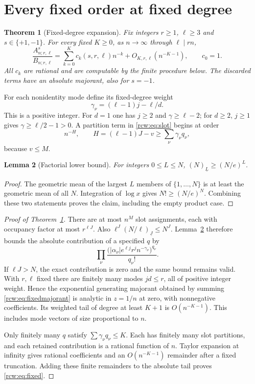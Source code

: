 \documentclass[11pt]{article}
\newtheorem{theorem}{Theorem}[section]
\newtheorem{lemma}[theorem]{Lemma}
\theoremstyle{definition}\newtheorem{definition}[theorem]{Definition}
\theoremstyle{remark}\newtheorem{remark}[theorem]{Remark}
\newcommand{\fall}[2]{(#1)_{\underline{#2}}}
\newcommand{\A}{A^s_{n;r,\ell}}
\newcommand{\B}{B_{n;r,\ell}}
\numberwithin{equation}{section}
\begin{document}
\section{Every fixed order at fixed degree}\label{rcw:sec:fixed}
\begin{theorem}[Fixed-degree expansion]\label{rcw:thm:fixed}
Fix integers $r\ge1$, $\ell\ge3$ and $s\in\{+1,-1\}$. For every fixed $K\ge0$, as $n\to\infty$ through $\ell\mid rn$,
\begin{equation}\label{rcw:eq:fixed}
 \frac{\A}{\B}=\sum_{k=0}^K c_k(s,r,\ell)n^{-k}
       +O_{K,r,\ell}(n^{-K-1}),\qquad c_0=1.
\end{equation}
All $c_k$ are rational and are computable by the finite procedure below. The discarded terms have an absolute majorant, also for $s=-1$.
\end{theorem}
For each nonidentity mode define its fixed-degree weight
\[
 \gamma_\nu=(\ell-1)j-\ell/d.
\]
This is a positive integer. For $d=1$ one has $j\ge2$ and $\gamma\ge\ell-2$; for $d\ge2$, $j\ge1$ gives $\gamma\ge\ell/2-1>0$. A partition term in \eqref{rcw:eq:slot} begins at order
\[
 n^{-H},\qquad H=(\ell-1)J-v\ge\sum_\nu\gamma_\nu q_\nu,
\]
because $v\le M$.

\begin{lemma}[Factorial lower bound]\label{rcw:lem:fall}
For integers $0\le L\le N$, $\fall NL\ge(N/e)^L$.
\end{lemma}
\begin{proof}
The geometric mean of the largest $L$ members of $\{1,\ldots,N\}$ is at least the geometric mean of all $N$. Integration of $\log x$ gives $N!\ge(N/e)^N$. Combining these two statements proves the claim, including the empty product case.
\end{proof}

\begin{proof}[Proof of Theorem~\ref{rcw:thm:fixed}]
There are at most $n^M$ slot assignments, each with occupancy factor at most $r^{\ell J}$. Also $\ell^J\fall{N/\ell}{J}\le N^J$. Lemma~\ref{rcw:lem:fall} therefore bounds the absolute contribution of a specified $q$ by
\begin{equation}\label{rcw:eq:fixedmajorant}
 \prod_\nu\frac{\bigl(|\alpha_\nu|e^{\ell j}r^j
                         n^{-\gamma_\nu}\bigr)^{q_\nu}}{q_\nu!}.
\end{equation}
If $\ell J>N$, the exact contribution is zero and the same bound remains valid. With $r,\ell$ fixed there are finitely many modes $jd\le r$, all of positive integer weight. Hence the exponential generating majorant obtained by summing \eqref{rcw:eq:fixedmajorant} is analytic in $z=1/n$ at zero, with nonnegative coefficients. Its weighted tail of degree at least $K+1$ is $O(n^{-K-1})$. This includes mode vectors of size proportional to $n$.

Only finitely many $q$ satisfy $\sum\gamma_\nu q_\nu\le K$. Each has finitely many slot partitions, and each retained contribution is a rational function of $n$. Taylor expansion at infinity gives rational coefficients and an $O(n^{-K-1})$ remainder after a fixed truncation. Adding these finite remainders to the absolute tail proves \eqref{rcw:eq:fixed}.
\end{proof}
\end{document}
